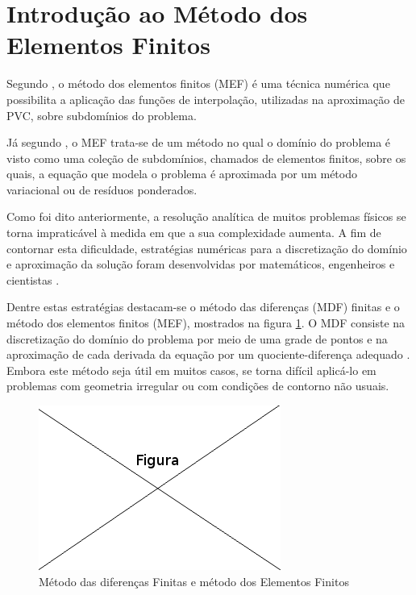 \section{Introdução ao Método dos Elementos Finitos}

Segundo \citep[p. 19, 27]{jin}, o método dos elementos finitos (MEF) é uma técnica numérica que possibilita a aplicação das funções de interpolação, utilizadas na aproximação de PVC, sobre subdomínios do problema.

Já segundo \citep[p. 13]{reddy}, o MEF trata-se de um método no qual o domínio do problema é visto como uma coleção de subdomínios, chamados de elementos finitos, sobre os quais, a equação que modela o problema é aproximada por um método variacional ou de resíduos ponderados.



Como foi dito anteriormente, a resolução analítica de muitos problemas físicos se torna impraticável à medida em que a sua  complexidade aumenta. 
A fim de contornar esta dificuldade, estratégias numéricas para a discretização do domínio e aproximação da solução foram desenvolvidas por matemáticos, engenheiros e cientistas \citep[p. 1]{zien}. 

Dentre estas estratégias destacam-se o método das diferenças (MDF) finitas e o método dos elementos finitos (MEF), mostrados na figura \ref{fig:mdfFem}. O MDF consiste na discretização do domínio do problema por meio de uma grade de pontos e na aproximação de cada derivada da equação por um quociente-diferença adequado
\citep[p. 684]{burden_faires}. Embora este método seja útil em muitos casos, se torna difícil aplicá-lo em problemas com geometria irregular ou com condições de contorno não usuais. \citep[p. 4]{huebner}

\begin{figure}[!htb]
\centering
\includegraphics[scale=0.5]{figuras/temp.png}
\caption{Método das diferenças Finitas e método dos Elementos Finitos}
\label{fig:mdfFem}
\end{figure}

